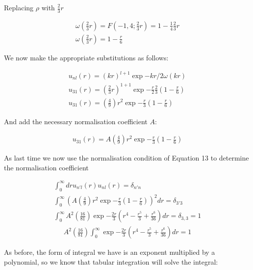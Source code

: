 \documentclass{article}
\begin{document}
    Replacing $\rho$ with $\frac{2}{3}r$

    \begin{gather}
        \omega(\frac{2}{3}r) = F(-1,4;\frac{2}{3}r) = 1 - \frac{1}{4}\frac{2}{3}r \\
        \omega(\frac{2}{3}r) = 1 - \frac{r}{6}
    \end{gather}

    We now make the appropriate substitutions as follows:

    \begin{gather*}
        u_{nl}(r) = (kr)^{l+1}\exp{-kr/2}\omega(kr)\\
        u_{31}(r) = (\frac{2}{3}r)^{1+1}\exp{-\frac{r}{2}\frac{2}{3}}(1-\frac{r}{6})\\
        u_{31}(r) = (\frac{4}{9})r^2\exp{-\frac{r}{3}}(1-\frac{r}{6})
    \end{gather*}
    
    And add the necessary normalisation coefficient $A$:

    \begin{gather}
        u_{31}(r) = A(\frac{4}{9})r^2\exp{-\frac{r}{3}}(1-\frac{r}{6})
    \end{gather}

    As last time we now use the normalisation condition of Equation 13 to determine the normalisation coefficient

    \begin{gather*}
        \int_{0}^{\infty}dr u_{n'l}(r) u_{nl}(r) = \delta_{n'n}\\
        \int_{0}^{\infty} (A(\frac{4}{9})r^2\exp{-\frac{r}{3}}(1-\frac{r}{6}))^2dr = \delta_{3'3}\\
        \int_{0}^{\infty} A^2(\frac{16}{81})\exp{-\frac{2r}{3}}(r^4 - \frac{r^5}{3}+\frac{r^6}{36})dr = \delta_{3,3} = 1
    \end{gather*}
    \begin{gather}
        A^2(\frac{16}{81})\int_{0}^{\infty} \exp{-\frac{2r}{3}}(r^4 - \frac{r^5}{3}+\frac{r^6}{36})dr  = 1
    \end{gather}

    As before, the form of integral we have is an exponent multiplied by a polynomial, so we know that tabular integration
    will solve the integral:
\end{document}
